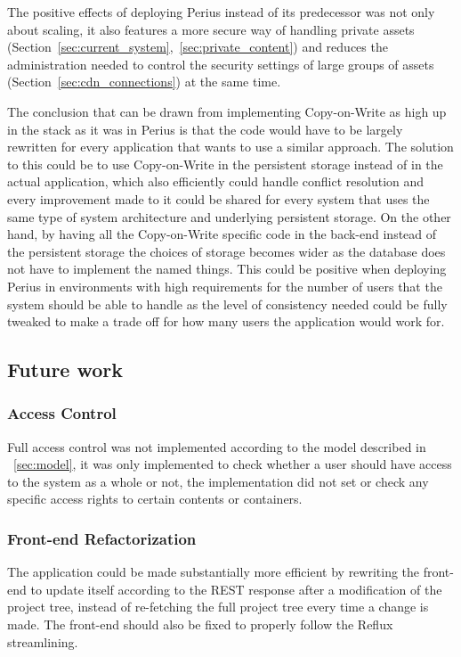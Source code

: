 \documentclass[a4paper,12pt]{article}
\begin{document}
\par The positive effects of deploying Perius instead of its predecessor was not only about
scaling, it also features a more secure way of handling private assets 
(Section~\ref{sec:current_system},~\ref{sec:private_content}) and reduces the
administration needed to control the security settings of large groups of assets
(Section~\ref{sec:cdn_connections}) at the same time.

\par The conclusion that can be drawn from implementing Copy-on-Write as high up in the stack as it
was in Perius is that the code would have to be largely rewritten for every application that wants
to use a similar approach. The solution to this could be to use Copy-on-Write in the persistent
storage instead of in the actual application, which also efficiently could handle conflict 
resolution and every improvement made to it could be shared for every system that uses the same 
type of system architecture and underlying persistent storage. On the other hand, by having all the
Copy-on-Write specific code in the back-end instead of the persistent storage the choices of
storage becomes wider as the database does not have to implement the named things. This could be
positive when deploying Perius in environments with high requirements for the number of users
that the system should be able to handle as the level of consistency needed could be fully tweaked
to make a trade off for how many users the application would work for.

\subsection{Future work}
\subsubsection{Access Control}
Full access control was not implemented according to the model described in ~\ref{sec:model}, it
was only implemented to check whether a user should have access to the system as a whole or not, the
implementation did not set or check any specific access rights to certain contents or containers.

\subsubsection{Front-end Refactorization}
The application could be made substantially more efficient by rewriting the front-end to update
itself according to the REST response after a modification of the project tree, instead of 
re-fetching the full project tree every time a change is made. The front-end should also be fixed to
properly follow the Reflux streamlining.

\newpage


\end{document}
